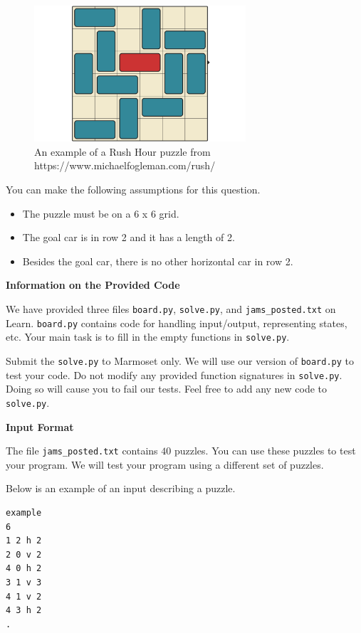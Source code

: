 \documentclass[12pt]{article}
\begin{document}
\begin{figure}[ht]
\centering
\includegraphics[width=0.7\textwidth]{images_posted/rush_hour_example.png}
\caption{An example of a Rush Hour puzzle from https://www.michaelfogleman.com/rush/}
\label{rush_hour_example}
\end{figure}

You can make the following assumptions for this question.
\begin{itemize}
  \item The puzzle must be on a 6 x 6 grid.
  \item The goal car is in row 2 and it has a length of 2.
  \item Besides the goal car, there is no other horizontal car in row 2.
\end{itemize}

{\bf Information on the Provided Code}

We have provided three files \verb+board.py+,  \verb+solve.py+, and \verb+jams_posted.txt+ on Learn. \verb+board.py+ contains code for handling input/output, representing states, etc. Your main task is to fill in the empty functions in \verb+solve.py+.

Submit the \verb+solve.py+ to Marmoset only. We will use our version of \verb+board.py+ to test your code. Do not modify any provided function signatures in \verb+solve.py+. Doing so will cause you to fail our tests. Feel free to add any new code to \verb+solve.py+. 

{\bf Input Format}

The file \verb+jams_posted.txt+ contains $40$ puzzles. You can use these puzzles to test your program. We will test your program using a different set of puzzles.

Below is an example of an input describing a puzzle.

\begin{verbatim}
example
6
1 2 h 2
2 0 v 2
4 0 h 2
3 1 v 3
4 1 v 2
4 3 h 2
.  
\end{verbatim}
\end{document}
